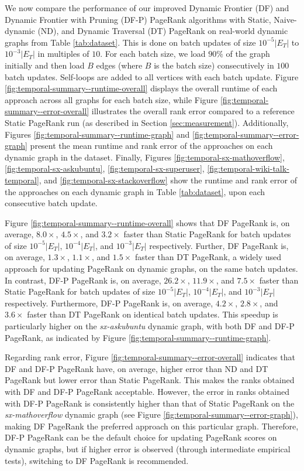 We now compare the performance of our improved Dynamic Frontier (DF) and Dynamic Frontier with Pruning (DF-P) PageRank algorithms with Static, Naive-dynamic (ND), and Dynamic Traversal (DT) PageRank on real-world dynamic graphs from Table \ref{tab:dataset}. This is done on batch updates of size $10^{-5}|E_T|$ to $10^{-3}|E_T|$ in multiples of $10$. For each batch size, we load $90\%$ of the graph initially and then load $B$ edges (where $B$ is the batch size) consecutively in $100$ batch updates. Self-loops are added to all vertices with each batch update. Figure \ref{fig:temporal-summary--runtime-overall} displays the overall runtime of each approach across all graphs for each batch size, while Figure \ref{fig:temporal-summary--error-overall} illustrates the overall rank error compared to a reference Static PageRank run (as described in Section \ref{sec:measurement}). Additionally, Figures \ref{fig:temporal-summary--runtime-graph} and \ref{fig:temporal-summary--error-graph} present the mean runtime and rank error of the approaches on each dynamic graph in the dataset. Finally, Figures \ref{fig:temporal-sx-mathoverflow}, \ref{fig:temporal-sx-askubuntu}, \ref{fig:temporal-sx-superuser}, \ref{fig:temporal-wiki-talk-temporal}, and \ref{fig:temporal-sx-stackoverflow} show the runtime and rank error of the approaches on each dynamic graph in Table \ref{tab:dataset}, upon each consecutive batch update.

Figure \ref{fig:temporal-summary--runtime-overall} shows that DF PageRank is, on average, $8.0\times$, $4.5\times$, and $3.2\times$ faster than Static PageRank for batch updates of size $10^{-5}|E_T|$, $10^{-4}|E_T|$, and $10^{-3}|E_T|$ respectively. Further, DF PageRank is, on average, $1.3\times$, $1.1\times$, and $1.5\times$ faster than DT PageRank, a widely used approach for updating PageRank on dynamic graphs, on the same batch updates. In contrast, DF-P PageRank is, on average, $26.2\times$, $11.9\times$, and $7.5\times$ faster than Static PageRank for batch updates of size $10^{-5}|E_T|$, $10^{-4}|E_T|$, and $10^{-3}|E_T|$ respectively. Furthermore, DF-P PageRank is, on average, $4.2\times$, $2.8\times$, and $3.6\times$ faster than DT PageRank on identical batch updates. This speedup is particularly higher on the \textit{sx-askubuntu} dynamic graph, with both DF and DF-P PageRank, as indicated by Figure \ref{fig:temporal-summary--runtime-graph}.

Regarding rank error, Figure \ref{fig:temporal-summary--error-overall} indicates that DF and DF-P PageRank have, on average, higher error than ND and DT PageRank but lower error than Static PageRank. This makes the ranks obtained with DF and DF-P PageRank acceptable. However, the error in ranks obtained with DF-P PageRank is consistently higher than that of Static PageRank on the \textit{sx-mathoverflow} dynamic graph (see Figure \ref{fig:temporal-summary--error-graph}), making DF PageRank the preferred approach on this particular graph. Therefore, DF-P PageRank can be the default choice for updating PageRank scores on dynamic graphs, but if higher error is observed (through intermediate empirical tests), switching to DF PageRank is recommended.


